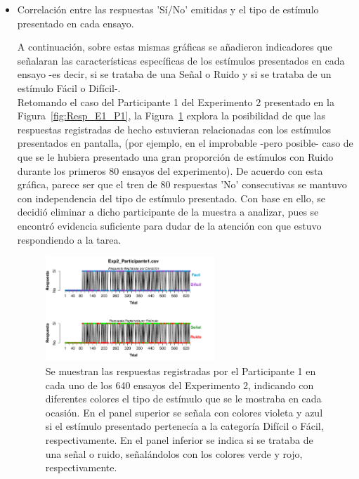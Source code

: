 \begin{itemize}

\item Correlación entre las respuestas 'Sí/No' emitidas y el tipo de estímulo presentado en cada ensayo.

A continuación, sobre estas mismas gráficas se añadieron indicadores que señalaran las características específicas de los estímulos presentados en cada ensayo -es decir, si se trataba de una Señal o Ruido y si se trataba de un estímulo Fácil o Difícil-.\\ 

Retomando el caso del Participante 1 del Experimento 2 presentado en la Figura~\ref{fig:Resp_E1_P1}, la Figura~\ref{fig:BiasResp_E1_P1} explora la posibilidad de que las respuestas registradas de hecho estuvieran relacionadas con los estímulos presentados en pantalla, (por ejemplo, en el improbable -pero posible- caso de que se le hubiera presentado una gran proporción de estímulos con Ruido durante los primeros 80 ensayos del experimento). De acuerdo con esta gráfica, parece ser que el tren de 80 respuestas 'No' consecutivas se mantuvo con independencia del tipo de estímulo presentado. Con base en ello, se decidió eliminar a dicho participante de la muestra a analizar, pues se encontró evidencia suficiente para dudar de la atención con que estuvo respondiendo a la tarea.\\

\begin{figure}[th]
\centering
\includegraphics[width=0.60\textwidth]{Figures/BiasResp_Exp2_P1} 
\caption[Respuesta por Tipo de Estimulo; ejemplo de participante sesgado]{Se muestran las respuestas registradas por el Participante 1 en cada uno de los 640 ensayos del Experimento 2, indicando con diferentes colores el tipo de estímulo que se le mostraba en cada ocasión. En el panel superior se señala con colores violeta y azul si el estímulo presentado pertenecía a la categoría Difícil o Fácil, respectivamente. En el panel inferior se indica si se trataba de una señal o ruido, señalándolos con los colores verde y rojo, respectivamente.}
\label{fig:BiasResp_E1_P1}
\end{figure}


\end{itemize}
